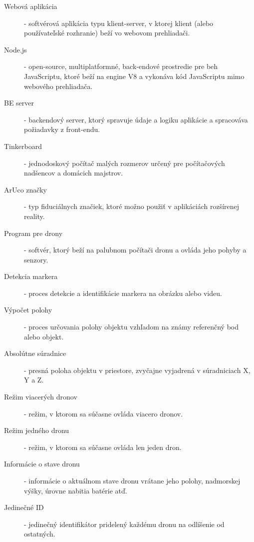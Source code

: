 \documentclass[]{tukediphc}
\begin{document}
\begin{description}
	\item[Webová aplikácia] - softvérová aplikácia typu klient-server, v ktorej klient (alebo používateľské rozhranie) beží vo webovom prehliadači.
	\item[Node.js] - open-source, multiplatformné, back-endové prostredie pre beh JavaScriptu, ktoré beží na engine V8 a vykonáva kód JavaScriptu mimo webového prehliadača.	
	\item[BE server] - backendový server, ktorý spravuje údaje a logiku aplikácie a spracováva požiadavky z front-endu.	
	\item[Tinkerboard] - jednodoskový počítač malých rozmerov určený pre počítačových nadšencov a domácich majstrov.	
	\item[ArUco značky] - typ fiduciálnych značiek, ktoré možno použiť v aplikáciách rozšírenej reality.	
	\item[Program pre drony] - softvér, ktorý beží na palubnom počítači dronu a ovláda jeho pohyby a senzory.
	\item[Detekcia markera] - proces detekcie a identifikácie markera na obrázku alebo videu.	
	\item[Výpočet polohy] - proces určovania polohy objektu vzhľadom na známy referenčný bod alebo objekt.	
	\item[Absolútne súradnice] - presná poloha objektu v priestore, zvyčajne vyjadrená v súradniciach X, Y a Z.	
	\item[Režim viacerých dronov] - režim, v ktorom sa súčasne ovláda viacero dronov.	
	\item[Režim jedného dronu] - režim, v ktorom sa súčasne ovláda len jeden dron.	
	\item[Informácie o stave dronu] - informácie o aktuálnom stave dronu vrátane jeho polohy, nadmorskej výšky, úrovne nabitia batérie atď.
	\item[Jedinečné ID] - jedinečný identifikátor pridelený každému dronu na odlíšenie od ostatných.
\end{description}

\kslovnikterminov
%

%

%

%

%   

%

%

%

%
 


% 
%
% 
% 
% 
% 
%
\newpage
{}
\protect\label{page:posledna}
\end{document}
